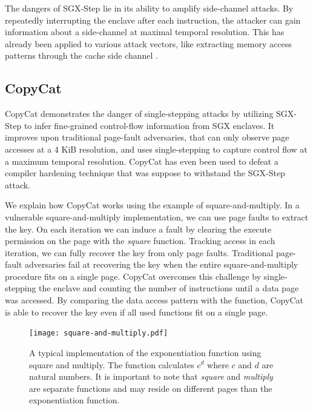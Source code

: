 \documentclass{llncs}
\begin{document}
The dangers of SGX-Step lie in its ability to amplify side-channel attacks.
By repeatedly interrupting the enclave after each instruction,
the attacker can gain information about a side-channel at maximal temporal resolution.
This has already been applied to various attack vectors,
like extracting memory access patterns through the cache side channel \cite{HahnelCP17}.

\subsection{CopyCat}

CopyCat \cite{MoghimiBHPS20} demonstrates the danger of single-stepping attacks
by utilizing SGX-Step to infer fine-grained control-flow information from SGX enclaves.
It improves upon traditional page-fault adversaries,
that can only observe page accesses at a 4 KiB resolution,
and uses single-stepping to capture control flow at a maximum temporal resolution.
CopyCat has even been used to defeat a compiler hardening technique \cite{HosseinzadehLLP18} that was
suppose to withstand the SGX-Step attack.

We explain how CopyCat works using the example of square-and-multiply.
In a vulnerable square-and-multiply implementation,
we can use page faults to extract the key.
On each iteration we can induce a fault by clearing the execute permission on
the page with the \emph{square} function.
Tracking access in each iteration, we can fully recover the key from only page faults.
Traditional page-fault adversaries fail at recovering the key when the entire
square-and-multiply procedure fits on a single page.
CopyCat overcomes this challenge by single-stepping the enclave and counting the
number of instructions until a data page was accessed.
By comparing the data access pattern with the function, CopyCat is able to recover the key
even if all used functions fit on a single page.

\begin{figure}[t!]
  \centering
  \texttt{[image: square-and-multiply.pdf]}
  \caption{A typical implementation of the exponentiation function using square and multiply.
    The function calculates $c^d$ where $c$ and $d$ are natural numbers.
    It is important to note that \emph{square} and \emph{multiply} are separate functions
    and may reside on different pages than the exponentiation function.}
  \label{fig:square-and-multiply}
\end{figure}
\end{document}
